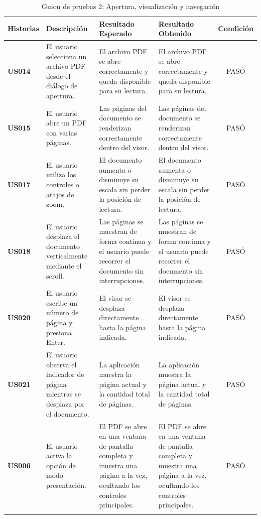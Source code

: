 \begin{longtable}{ | p{2cm} | p{3cm} | p{4cm} | p{4cm} | c |}
      \hline
      \textbf{Historias} & \textbf{Descripción} & \textbf{Resultado Esperado} & \textbf{Resultado Obtenido} & \textbf{Condición}\\
      \hline
      \textbf{US014} & El usuario selecciona un archivo PDF desde el diálogo de apertura. & El archivo PDF se abre correctamente y queda disponible para su lectura. & El archivo PDF se abre correctamente y queda disponible para su lectura. & PASÓ \\
      \hline

      \textbf{US015} & El usuario abre un PDF con varias páginas. & Las páginas del documento se renderizan correctamente dentro del visor. & Las páginas del documento se renderizan correctamente dentro del visor. & PASÓ \\
      \hline

      \textbf{US017} & El usuario utiliza los controles o atajos de zoom. & El documento aumenta o disminuye su escala sin perder la posición de lectura. & El documento aumenta o disminuye su escala sin perder la posición de lectura. & PASÓ \\
      \hline

      \textbf{US018} & El usuario desplaza el documento verticalmente mediante el scroll. & Las páginas se muestran de forma continua y el usuario puede recorrer el documento sin interrupciones. & Las páginas se muestran de forma continua y el usuario puede recorrer el documento sin interrupciones. & PASÓ \\
      \hline

      \textbf{US020} & El usuario escribe un número de página y presiona Enter. & El visor se desplaza directamente hasta la página indicada. & El visor se desplaza directamente hasta la página indicada. & PASÓ \\
      \hline

      \textbf{US021} & El usuario observa el indicador de página mientras se desplaza por el documento. & La aplicación muestra la página actual y la cantidad total de páginas. & La aplicación muestra la página actual y la cantidad total de páginas. & PASÓ \\
      \hline

      \textbf{US006} & El usuario activa la opción de modo presentación. & El PDF se abre en una ventana de pantalla completa y muestra una página a la vez, ocultando los controles principales. & El PDF se abre en una ventana de pantalla completa y muestra una página a la vez, ocultando los controles principales. & PASÓ \\
      \hline
      
      \caption{Guion de pruebas 2: Apertura, visualización y navegación}
      \label{TestScript1}
\end{longtable}

